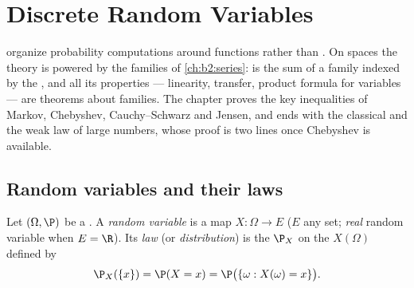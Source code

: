 \chapter{Discrete Random Variables}\label{ch:b2:randomvar}

 organize probability computations around
functions rather than . On  spaces the theory is
powered by the  families of \cref{ch:b2:series}:
 is the sum of a family indexed by the ,
and all its properties --- linearity, transfer, product formula
for  variables --- are theorems about 
families. The chapter proves the key inequalities of Markov,
Chebyshev, Cauchy--Schwarz and Jensen, and ends with the classical
 and the weak law of large numbers, whose proof is two lines
once Chebyshev is available.

\section{Random variables and their laws}

\begin{definition}\label{def:b2:randomvar:law}
Let $(\Omega, \P)$ be a  . A
\emph{random variable} is a map $X \colon \Omega \to E$ ($E$ any
set; \emph{real} random variable when $E = \R$). Its \emph{law}
(or \emph{distribution}) is the  $\P_X$ on the
 $X(\Omega)$ defined by
\[
\P_X(\{x\}) = \P(X = x)
= \P\bigl(\{\omega : X(\omega) = x\}\bigr) .
\]
\end{definition}

